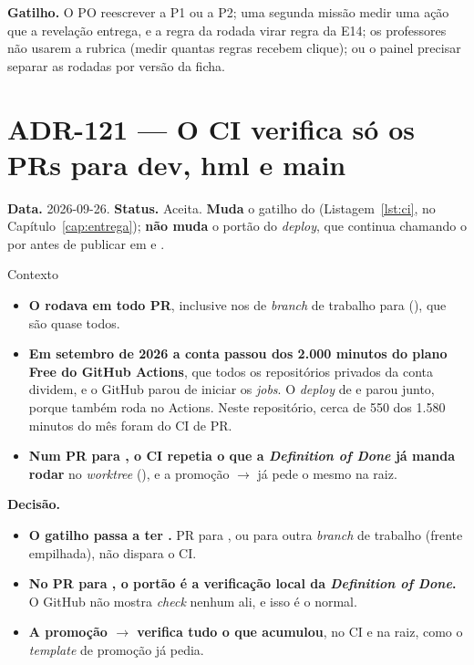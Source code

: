 \textbf{Gatilho.} O PO reescrever a P1 ou a P2; uma segunda missão medir uma
ação que a revelação entrega, e a regra da rodada virar regra da E14; os
professores não usarem a rubrica (medir quantas regras recebem clique); ou o
painel precisar separar as rodadas por versão da ficha.

\section{ADR-121 --- O CI verifica só os PRs para dev, hml e main}
\label{adr:ci-so-nos-prs-de-ambiente}

\textbf{Data.} 2026-09-26. \textbf{Status.} Aceita.
\textbf{Muda} o gatilho do  (Listagem~\ref{lst:ci}, no
Capítulo~\ref{cap:entrega}); \textbf{não
muda} o portão do \emph{deploy}, que continua chamando o  por
 antes de publicar em  e .

\begin{especificacao}{Contexto}
\begin{itemize}
  \item \textbf{O  rodava em todo PR}, inclusive nos de \emph{branch}
    de trabalho para  (), que são quase todos.
  \item \textbf{Em setembro de 2026 a conta passou dos 2.000 minutos do plano
    Free do GitHub Actions}, que todos os repositórios privados da conta
    dividem, e o GitHub parou de iniciar os \emph{jobs}. O \emph{deploy} de
     e  parou junto, porque também roda no Actions. Neste
    repositório, cerca de 550 dos 1.580 minutos do mês foram do CI de PR.
  \item \textbf{Num PR para , o CI repetia o que a
    \emph{Definition of Done} já manda rodar} no \emph{worktree}
    (), e a promoção 
    \(\to\)  já pede o mesmo na raiz.
\end{itemize}
\end{especificacao}

\textbf{Decisão.}

\begin{itemize}
  \item \textbf{O gatilho  passa a ter
    .} PR para , ou para outra
    \emph{branch} de trabalho (frente empilhada), não dispara o CI.
  \item \textbf{No PR para , o portão é a verificação local da
    \emph{Definition of Done}.} O GitHub não mostra \emph{check} nenhum ali, e
    isso é o normal.
  \item \textbf{A promoção  \(\to\)  verifica tudo o que
    acumulou}, no CI e na raiz, como o \emph{template} de promoção já pedia.
\end{itemize}

